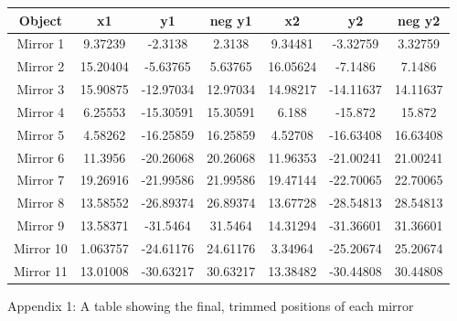 \documentclass[11pt, letterpaper]{article}
\begin{document}
\begin{center}

\begin{tabular}{|c|c|c|c|c|c|c|}
	\hline
	Object & x1 & y1 & neg y1 & x2 & y2 & neg y2 \\
	\hline
	Mirror 1 & 9.37239 & -2.3138 & 2.3138 & 9.34481 & -3.32759 & 3.32759 \\
	\hline
	Mirror 2 & 15.20404 & -5.63765 & 5.63765 & 16.05624 & -7.1486 & 7.1486 \\
	\hline
	Mirror 3 & 15.90875 & -12.97034 & 12.97034 & 14.98217 & -14.11637 & 14.11637 \\
	\hline
	Mirror 4 & 6.25553 & -15.30591 & 15.30591 & 6.188 & -15.872 & 15.872 \\
	\hline
	Mirror 5 & 4.58262 & -16.25859 & 16.25859 & 4.52708 & -16.63408 & 16.63408 \\
	\hline
	Mirror 6 & 11.3956 & -20.26068 & 20.26068 & 11.96353 & -21.00241 & 21.00241 \\
	\hline
	Mirror 7 & 19.26916 & -21.99586 & 21.99586 & 19.47144 & -22.70065 & 22.70065 \\
	\hline
	Mirror 8 & 13.58552 & -26.89374 & 26.89374 & 13.67728 & -28.54813 & 28.54813 \\
	\hline
	Mirror 9 & 13.58371 & -31.5464 & 31.5464 & 14.31294 & -31.36601 & 31.36601 \\
	\hline
	Mirror 10 & 1.063757 & -24.61176 & 24.61176 & 3.34964 & -25.20674 & 25.20674 \\
	\hline
	Mirror 11 & 13.01008 & -30.63217 & 30.63217 & 13.38482 & -30.44808 & 30.44808 \\
	\hline
	
\end{tabular}

{Appendix 1: A table showing the final, trimmed positions of each mirror}
\end{center}
\end{document}

